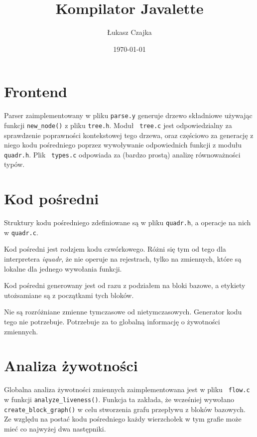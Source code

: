 \documentclass[a4paper,12pt]{article}
\begin{document}
\title{Kompilator Javalette}
\author{Łukasz Czajka}
\date{\today}
\maketitle

\newpage

\tableofcontents

\newpage

\section{Frontend}

Parser zaimplementowany w pliku {\tt parse.y} generuje drzewo składniowe
używając funkcji {\tt new\_node()} z pliku {\tt tree.h}. Moduł {\tt
tree.c} jest odpowiedzialny za sprawdzenie poprawności kontekstowej tego
drzewa, oraz częściowo za generację z niego kodu pośredniego poprzez
wywoływanie odpowiednich funkcji z modułu {\tt quadr.h}. Plik {\tt
types.c} odpowiada za (bardzo prostą) analizę równoważności typów.

\section{Kod pośredni}

Struktury kodu pośredniego zdefiniowane są w pliku {\tt quadr.h}, a
operacje na nich w {\tt quadr.c}.

Kod pośredni jest rodzjem kodu czwórkowego. Różni się tym od tego dla
interpretera {\em iquadr}, że nie operuje na rejestrach, tylko na
zmiennych, które są lokalne dla jednego wywołania funkcji.

Kod pośredni generowany jest od razu z podziałem na bloki bazowe, a
etykiety utożsamiane są z początkami tych bloków.

Nie są rozróżniane zmienne tymczasowe od nietymczasowych. Generator kodu
tego nie potrzebuje. Potrzebuje za to globalną informację o żywotności
zmiennych.


\section{Analiza żywotności}

Globalna analiza żywotności zmiennych zaimplementowana jest w pliku {\tt
flow.c} w funkcji {\tt analyze\_liveness()}. Funkcja ta zakłada, że
wcześniej wywołano {\tt create\_block\_graph()} w celu stworzenia grafu
przepływu z bloków bazowych. Ze względu na postać kodu pośredniego każdy
wierzchołek w tym grafie może mieć co najwyżej dwa następniki.
\end{document}
